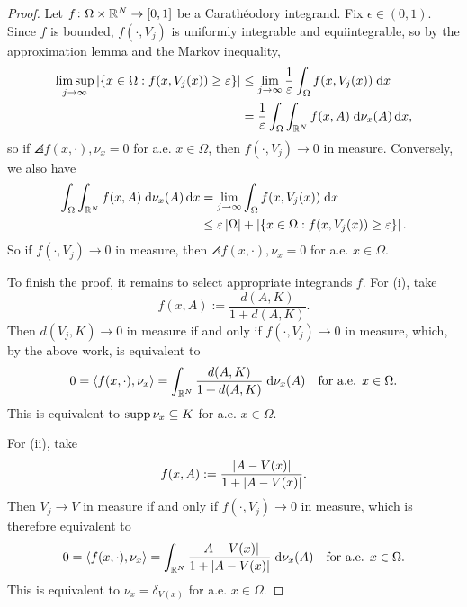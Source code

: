 \begin{proof}
    Let $f \colon \Omega \times \mathbb{R}^N \to [0,1]$ be a Carath\'eodory integrand. Fix $\epsilon \in (0,1)$. Since $f$ is bounded, $f(\cdot,V_j)$ is uniformly integrable and equiintegrable, so by the approximation lemma and the Markov inequality, 
    \begin{equation} \begin{aligned}
        \limsup_{j \to \infty} \left\lvert {\left\{ { x \in \Omega : f(x,V_j(x)) \geq \varepsilon} \right\}} \right\rvert &\leq \lim_{j \to \infty} \frac{1}{\varepsilon} \int_\Omega f(x,V_j(x)) \; \mathrm{d} x \\
                                                                                      &= \frac{1}{\varepsilon} \int_\Omega \int_{\mathbb{R}^N} f(x,A) \; \mathrm{d}\nu_x(A) \, \mathrm{d} x,
    \end{aligned} \end{equation}
    so if $\angles{f(x,\cdot),\nu_x} = 0$ for a.e. $x \in \Omega$, then $f(\cdot,V_j) \to 0$ in measure. Conversely, we also have 
    \begin{equation} \begin{aligned}
        \int_\Omega \int_{\mathbb{R}^N} f(x,A) \; \mathrm{d}\nu_x(A) \, \mathrm{d} x &= \lim_{j \to \infty} \int_\Omega f(x,V_j(x)) \; \mathrm{d} x \\
                                                               &\leq \varepsilon\left\lvert {\Omega} \right\rvert + \left\lvert {\left\{ {x \in \Omega : f(x,V_j(x)) \geq \varepsilon} \right\}} \right\rvert.
    \end{aligned} \end{equation}
    So if $f(\cdot,V_j) \to 0$ in measure, then $\angles{f(x,\cdot),\nu_x} = 0$ for a.e. $x \in \Omega$.

    To finish the proof, it remains to select appropriate integrands $f$. For (i), take 
    \begin{equation}
        f(x,A) := \frac{d(A,K)}{1 + d(A,K)}.
    \end{equation}
    Then $d(V_j,K) \to 0$ in measure if and only if $f(\cdot,V_j) \to 0$ in measure, which, by the above work, is equivalent to 
    \begin{equation}
        0 = \left\langle {f(x,\cdot),\nu_x} \right\rangle = \int_{\mathbb{R}^N} \frac{d(A,K)}{1 + d(A,K)} \; \mathrm{d}\nu_x(A) \quad \text{for a.e. } x \in \Omega.
    \end{equation}
    This is equivalent to $\operatorname{supp}{\nu_x} \subseteq K$ for a.e. $x \in \Omega$.

    For (ii), take 
    \begin{equation}
        f(x,A) := \frac{\left\lvert {A - V(x)} \right\rvert}{1 + \left\lvert {A - V(x)} \right\rvert}.
    \end{equation}
    Then $V_j \to V$ in measure if and only if $f(\cdot,V_j) \to 0$ in measure, which is therefore equivalent to 
    \begin{equation}
        0 = \left\langle {f(x,\cdot),\nu_x} \right\rangle = \int_{\mathbb{R}^N} \frac{\left\lvert {A - V(x)} \right\rvert}{1 + \left\lvert {A - V(x)} \right\rvert} \; \mathrm{d}\nu_x(A) \quad \text{for a.e. } x \in \Omega.
    \end{equation}
    This is equivalent to $\nu_x = \delta_{V(x)}$ for a.e. $x \in \Omega$.
\end{proof}


